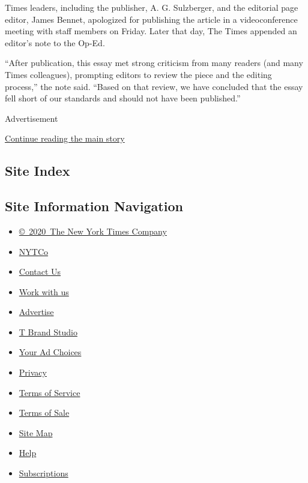 Times leaders, including the publisher, A. G. Sulzberger, and the
editorial page editor, James Bennet, apologized for publishing the
article in a videoconference meeting with staff members on Friday. Later
that day, The Times appended an editor's note to the Op-Ed.

``After publication, this essay met strong criticism from many readers
(and many Times colleagues), prompting editors to review the piece and
the editing process,'' the note said. ``Based on that review, we have
concluded that the essay fell short of our standards and should not have
been published.''

Advertisement

\protect\hyperlink{after-bottom}{Continue reading the main story}

\hypertarget{site-index}{%
\subsection{Site Index}\label{site-index}}

\hypertarget{site-information-navigation}{%
\subsection{Site Information
Navigation}\label{site-information-navigation}}

\begin{itemize}
\tightlist
\item
  \href{https://help.nytimes3xbfgragh.onion/hc/en-us/articles/115014792127-Copyright-notice}{©~2020~The
  New York Times Company}
\end{itemize}

\begin{itemize}
\tightlist
\item
  \href{https://www.nytco.com/}{NYTCo}
\item
  \href{https://help.nytimes3xbfgragh.onion/hc/en-us/articles/115015385887-Contact-Us}{Contact
  Us}
\item
  \href{https://www.nytco.com/careers/}{Work with us}
\item
  \href{https://nytmediakit.com/}{Advertise}
\item
  \href{http://www.tbrandstudio.com/}{T Brand Studio}
\item
  \href{https://www.nytimes3xbfgragh.onion/privacy/cookie-policy\#how-do-i-manage-trackers}{Your
  Ad Choices}
\item
  \href{https://www.nytimes3xbfgragh.onion/privacy}{Privacy}
\item
  \href{https://help.nytimes3xbfgragh.onion/hc/en-us/articles/115014893428-Terms-of-service}{Terms
  of Service}
\item
  \href{https://help.nytimes3xbfgragh.onion/hc/en-us/articles/115014893968-Terms-of-sale}{Terms
  of Sale}
\item
  \href{https://spiderbites.nytimes3xbfgragh.onion}{Site Map}
\item
  \href{https://help.nytimes3xbfgragh.onion/hc/en-us}{Help}
\item
  \href{https://www.nytimes3xbfgragh.onion/subscription?campaignId=37WXW}{Subscriptions}
\end{itemize}
